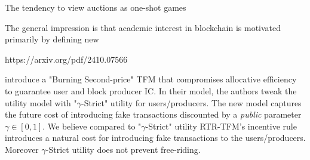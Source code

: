 \documentclass[sigconf,anonymous]{aamas}
\newcommand{\varul}[1]{\textcolor{red}{#1}}
\newcommand{\ourTFM}{\textsc{RTR-TFM}}
\renewcommand{\paragraph}[1]{\smallskip\noindent\textbf{#1}}
\begin{document}
The tendency to view auctions as one-shot games






The general impression is that academic interest in blockchain is motivated primarily by defining new 














https://arxiv.org/pdf/2410.07566




\citet{chung2023foundations} introduce a "Burning Second-price" TFM that compromises allocative efficiency to guarantee user and block producer IC. In their model, the authors tweak the utility model with "$\gamma$-Strict" utility for users/producers. The new model captures the future cost of introducing fake transactions discounted by a \textit{public} parameter $\gamma\in [0,1]$. We believe compared to  "$\gamma$-Strict" utility \ourTFM's incentive rule introduces a natural cost for introducing fake transactions to the users/producers. Moreover $\gamma$-Strict utility does not prevent free-riding.
\end{document}
